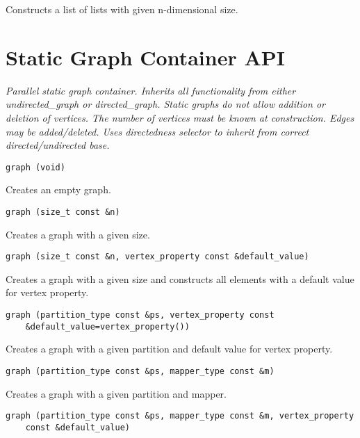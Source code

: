 Constructs a list of lists with given n-dimensional size. 


\section{ Static Graph Container API } \label{sec-stgraf-cont}

\emph{ Parallel static graph container. Inherits all functionality from either undirected\_graph or directed\_graph.  Static graphs do not allow addition or deletion of vertices. The number of vertices must be known at construction. Edges may be added/deleted. Uses directedness selector to inherit from correct directed/undirected base.  }
 
\begin{verbatim}
graph (void)
\end{verbatim}

Creates an empty graph.
 
\begin{verbatim}
graph (size_t const &n)
\end{verbatim}

Creates a graph with a given size.
 
\begin{verbatim}
graph (size_t const &n, vertex_property const &default_value)
\end{verbatim}

Creates a graph with a given size and constructs all elements with a default value for vertex property.
 
\begin{verbatim}
graph (partition_type const &ps, vertex_property const 
    &default_value=vertex_property())
\end{verbatim}

Creates a graph with a given partition and default value for vertex property.
 
\begin{verbatim}
graph (partition_type const &ps, mapper_type const &m)
\end{verbatim}

Creates a graph with a given partition and mapper.
 
\begin{verbatim}
graph (partition_type const &ps, mapper_type const &m, vertex_property 
    const &default_value)
\end{verbatim}


